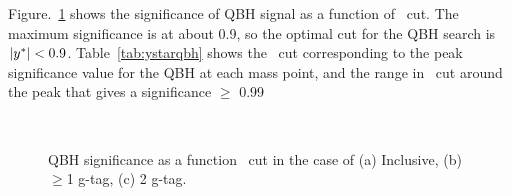 Figure.~\ref{fig: qbh significance as a function of y* cut} shows the significance of QBH signal as a function of \ystar\ cut. The maximum significance is at about 0.9, so the optimal cut for the QBH search is $|y^\ast| < 0.9$. Table~\ref{tab:ystarqbh} shows the \ystar\ cut corresponding to the peak significance value for the QBH at each mass point, and the range in \ystar\ cut around the peak that gives a significance $\geq$ 0.99
\begin{figure}[!htb]
        \centering
        \\
        \caption{QBH significance as a function \ystar\ cut in the case of (a) Inclusive, (b) $\geq$1 g-tag, (c) 2 g-tag.}
        \label{fig: qbh significance as a function of y* cut}
\end{figure}


